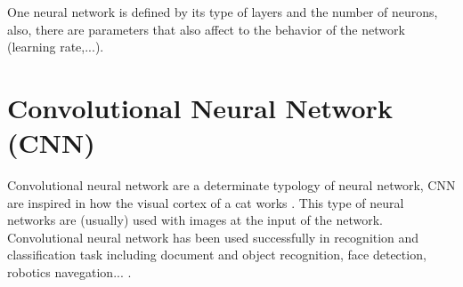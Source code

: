 One neural network is defined by its type of layers and the number of neurons, also, there are parameters that also affect to the behavior of the network (learning rate,...)\cite{Lecum2}.\\



\section{Convolutional Neural Network (CNN)}
Convolutional neural network are a determinate typology of neural network, CNN are inspired in how the visual cortex of a cat works \cite{Doorn}. This type of neural networks are (usually) used with images at the input of the network.\\

Convolutional neural network has been used successfully in recognition and classification task including document and object recognition, face detection, robotics navegation... \cite{Lecum2, Lecum3}.\\
